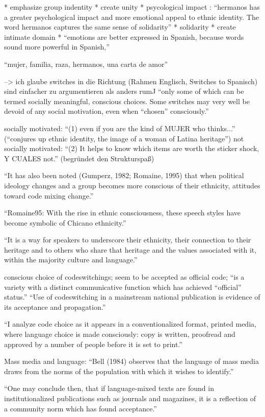 * emphasize group indentity
* create unity
* psycological impact : ``hermanos has a greater psychological
impact and more emotional appeal to ethnic identity. The word hermanos captures the
same sense of solidarity''
* solidarity
* create intimate domain
* ``emotions are better expressed in Spanish, because words sound more
powerful in Spanish,''

``mujer, familia, raza, hermanos, una carta de amor''

--> ich glaube switches in die Richtung (Rahmen Englisch, Switches to Spanisch) sind einfacher zu argumentieren als anders rum^^

``only some of which can be termed socially meaningful,
conscious choices. Some switches may very well be devoid of any social motivation,
even when “chosen” consciously.''

socially motivated: ``(1) even if you are the kind of MUJER who thinks...'' (``conjures up ethnic identity, the image of a woman of Latina heritage'')
not socially motivated: ``(2) It helps to know which items are worth the sticker shock, Y CUALES not.'' (begründet den Strukturspaß)

``It has also been noted (Gumperz, 1982; Romaine, 1995) that when political ideology
changes and a group becomes more conscious of their ethnicity, attitudes toward code
mixing change.''

``Romaine95: With the rise in ethnic
consciousness, these speech styles have become symbolic of Chicano ethnicity.''

``It is a way for speakers to underscore their ethnicity,
their connection to their heritage and to others who share that heritage and the values
associated with it, within the majority culture and language.''

conscious choice of codeswitchings;
seem to be accepted as official code; ``is a variety with a distinct communicative function which
has achieved “official” status.''
``Use of codeswitching in a mainstream national publication is evidence of its
acceptance and propagation.''

``I analyze code choice as it appears in a conventionalized format, printed media,
where language choice is made consciously: copy is written, proofread and approved
by a number of people before it is set to print.''

Mass media and language: ``Bell (1984) observes that the language of mass media draws from the norms of
the population with which it wishes to identify.''

``One may conclude then, that if language-mixed
texts are found in institutionalized publications such as journals and magazines, it is a
reflection of a community norm which has found acceptance.''



